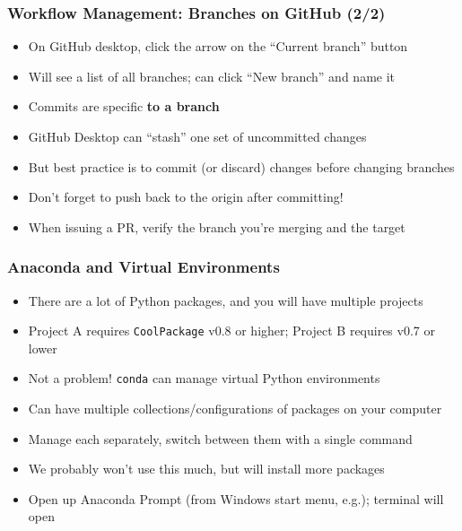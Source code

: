 \documentclass[aspectratio=169]{beamer}
\begin{document}
\begin{frame}
\frametitle{Workflow Management: Branches on GitHub (2/2)}
\begin{itemize}
	\item On GitHub desktop, click the arrow on the ``Current branch'' button
	
	\item Will see a list of all branches; can click ``New branch'' and name it
	
	\item <2->Commits are specific \textbf{to a branch}
	
	\item <3->GitHub Desktop can ``stash'' one set of uncommitted changes
	
	\item <3->But best practice is to commit (or discard) changes before changing branches
	
	\item <4->Don't forget to push back to the origin after committing!
	
	\item <4->When issuing a PR, verify the branch you're merging and the target
\end{itemize}

\end{frame}


\begin{frame}
\frametitle{Anaconda and Virtual Environments}
\begin{itemize}
	\item There are a lot of Python packages, and you will have multiple projects
	
	\item Project A requires \texttt{CoolPackage} v0.8 or higher; Project B requires v0.7 or lower
	
	\item <2->Not a problem! \texttt{conda} can manage virtual Python environments
	
	\item <2->Can have multiple collections/configurations of packages on your computer
	
	\item <2->Manage each separately, switch between them with a single command
	
	\item <3->We probably won't use this much, but will install more packages
	
	\item <3->Open up Anaconda Prompt (from Windows start menu, e.g.); terminal will open
\end{itemize}
\end{frame}
\end{document}
